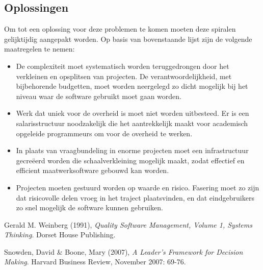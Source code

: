 \documentclass[10pt]{article}   	%
\begin{document}
\begin{multicols}{2}
\section{Oplossingen}
Om tot een oplossing voor deze problemen te komen moeten deze spiralen gelijktijdig aangepakt worden.
Op basis van bovenstaande lijst zijn de volgende maatregelen te nemen:
\begin{itemize}
\item De complexiteit moet systematisch worden teruggedrongen door het verkleinen en opsplitsen van 
projecten. De verantwoordelijkheid, met bijbehorende budgetten, moet worden neergelegd zo dicht
mogelijk bij het niveau waar de software gebruikt moet gaan worden. 
\item Werk dat uniek voor de overheid is moet niet worden uitbesteed. Er is een salarisstructuur noodzakelijk
die het aantrekkelijk maakt voor academisch opgeleide programmeurs om voor de overheid te werken.
\item In plaats van vraagbundeling in enorme projecten moet een infrastructuur gecreëerd worden die
schaalverkleining mogelijk maakt, zodat effectief en efficient maatwerksoftware gebouwd kan worden.
\item Projecten moeten gestuurd worden op waarde en risico. Fasering moet zo zijn dat risicovolle delen 
vroeg in het traject plaatsvinden, en dat eindgebruikers zo snel mogelijk de software kunnen gebruiken.
\end{itemize}
\begin{thebibliography}{9}

  Gerald M. Weinberg (1991),
  \emph{Quality Software Management, Volume 1, Systems Thinking}.
  Dorset House Publishing.

  Snowden, David \& Boone, Mary (2007),
  \emph{A Leader's Framework for Decision Making}.
  Harvard Business Review, November 2007: 69-76.

\end{thebibliography}


\end{multicols}
\end{document}
